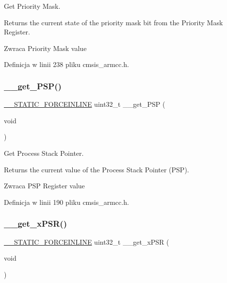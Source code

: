 Get Priority Mask. 

Returns the current state of the priority mask bit from the Priority Mask Register. \begin{DoxyReturn}{Zwraca}
Priority Mask value 
\end{DoxyReturn}


Definicja w linii 238 pliku cmsis\+\_\+armcc.\+h.

\mbox{\label{group___c_m_s_i_s___core___reg_acc_functions_ga826c53e30812e350c77f58aac9f42bcb}} 
\subsubsection{\texorpdfstring{\+\_\+\+\_\+get\+\_\+\+P\+S\+P()}{\_\_get\_PSP()}}
{\footnotesize\ttfamily \hyperlink{cmsis__iccarm_8h_ab904513442afdf77d4f8c74f23cbb040}{\+\_\+\+\_\+\+S\+T\+A\+T\+I\+C\+\_\+\+F\+O\+R\+C\+E\+I\+N\+L\+I\+NE} uint32\+\_\+t \+\_\+\+\_\+get\+\_\+\+P\+SP (\begin{DoxyParamCaption}\item[{void}]{ }\end{DoxyParamCaption})}



Get Process Stack Pointer. 

Returns the current value of the Process Stack Pointer (P\+SP). \begin{DoxyReturn}{Zwraca}
P\+SP Register value 
\end{DoxyReturn}


Definicja w linii 190 pliku cmsis\+\_\+armcc.\+h.

\mbox{\label{group___c_m_s_i_s___core___reg_acc_functions_ga52ca795dc9429ee0ac64ddd12c034834}} 
\subsubsection{\texorpdfstring{\+\_\+\+\_\+get\+\_\+x\+P\+S\+R()}{\_\_get\_xPSR()}}
{\footnotesize\ttfamily \hyperlink{cmsis__iccarm_8h_ab904513442afdf77d4f8c74f23cbb040}{\+\_\+\+\_\+\+S\+T\+A\+T\+I\+C\+\_\+\+F\+O\+R\+C\+E\+I\+N\+L\+I\+NE} uint32\+\_\+t \+\_\+\+\_\+get\+\_\+x\+P\+SR (\begin{DoxyParamCaption}\item[{void}]{ }\end{DoxyParamCaption})}



